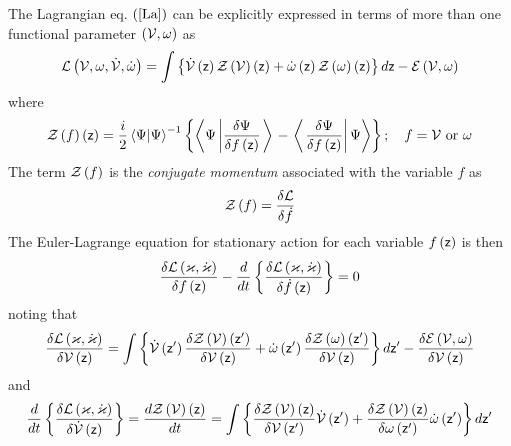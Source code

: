 The Lagrangian eq. $\left( \ref{La}\right) $ can be explicitly expressed in
terms of more than one functional parameter $\left( {\cal V},\omega \right) $
as 
\begin{equation}
{\cal L}\left( {\cal V},\omega ,{\cal \dot{V}},\dot{\omega}\right) =\int
\left\{ {\cal \dot{V}}\left( {\sf z}\right) {\cal Z}\left( {\cal V}\right)
\left( {\sf z}\right) +{\cal \dot{\omega}}\left( {\sf z}\right) {\cal Z}%
\left( {\cal \omega }\right) \left( {\sf z}\right) \right\} d{\sf z}-{\cal E}%
\left( {\cal V},\omega \right)
\end{equation}%
where 
\begin{equation}
{\cal Z}\left( f\right) \left( {\sf z}\right) =\frac{i}{2}\left\langle \Psi
|\Psi \right\rangle ^{-1}\left\{ \left\langle \Psi \left| \frac{\delta \Psi 
}{\delta f\left( {\sf z}\right) }\right. \right\rangle \right. -\left.
\left\langle \left. \frac{\delta \Psi }{\delta f\left( {\sf z}\right) }%
\right| \Psi \right\rangle \right\} ;\quad f={\cal V}\text{ or }\omega
\end{equation}%
The term ${\cal Z}\left( f\right) $ is the {\em conjugate momentum}
associated with the variable $f$ as 
\begin{equation}
{\cal Z}\left( f\right) =\frac{\delta {\cal L}}{\delta \dot{f}}
\end{equation}%
The Euler-Lagrange equation for stationary action for each variable $f\left( 
{\sf z}\right) $ is then 
\begin{equation}
\frac{\delta {\cal L}\left( {\cal \varkappa },{\cal \dot{\varkappa}}\right) 
}{\delta f\left( {\sf z}\right) }-\frac{d}{dt}\left\{ \frac{\delta {\cal L}%
\left( {\cal \varkappa },{\cal \dot{\varkappa}}\right) }{\delta \dot{f}%
\left( {\sf z}\right) }\right\} =0
\end{equation}%
noting that 
\begin{equation}
\frac{\delta {\cal L}\left( {\cal \varkappa },{\cal \dot{\varkappa}}\right) 
}{\delta {\cal V}\left( {\sf z}\right) }=\int \left\{ {\cal \dot{V}}\left( 
{\sf z}^{\prime }\right) \frac{\delta {\cal Z}\left( {\cal V}\right) \left( 
{\sf z}^{\prime }\right) }{\delta {\cal V}\left( {\sf z}\right) }+{\cal \dot{%
\omega}}\left( {\sf z}^{\prime }\right) \frac{\delta {\cal Z}\left( {\cal %
\omega }\right) \left( {\sf z}^{\prime }\right) }{\delta {\cal V}\left( {\sf %
z}\right) }\right\} d{\sf z}^{\prime }-\frac{\delta {\cal E}\left( {\cal V}%
,\omega \right) }{\delta {\cal V}\left( {\sf z}\right) }
\end{equation}%
and%
\begin{equation}
\frac{d}{dt}\left\{ \frac{\delta {\cal L}\left( {\cal \varkappa },{\cal \dot{%
\varkappa}}\right) }{\delta {\cal \dot{V}}\left( {\sf z}\right) }\right\} =%
\frac{d{\cal Z}\left( {\cal V}\right) \left( {\sf z}\right) }{dt}=\int
\left\{ \frac{\delta {\cal Z}\left( {\cal V}\right) \left( {\sf z}\right) }{%
\delta {\cal V}\left( {\sf z}^{\prime }\right) }{\cal \dot{V}}\left( {\sf z}%
^{\prime }\right) +\frac{\delta {\cal Z}\left( {\cal V}\right) \left( {\sf z}%
\right) }{\delta {\cal \omega }\left( {\sf z}^{\prime }\right) }{\cal \dot{%
\omega}}\left( {\sf z}^{\prime }\right) \right\} d{\sf z}^{\prime }
\end{equation}%
